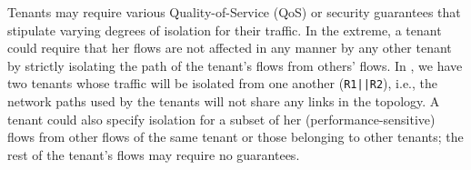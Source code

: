 
 Tenants may require various
  Quality-of-Service (QoS) or security guarantees that stipulate
  varying degrees of isolation for their traffic. In the extreme, a
  tenant could require that her flows are not affected in any manner
  by any other tenant by strictly isolating the path of the tenant's
  flows from others' flows. In , we have two
  tenants whose traffic will be isolated from one another 
  (\texttt{R1||R2}), i.e., the
  network paths used by the tenants will not share any links in the
  topology.  A tenant could also specify isolation for a subset of her
  (performance-sensitive) flows from other flows of the same tenant or
  those belonging to other tenants; the rest of the tenant's flows may
  require no guarantees.

 

